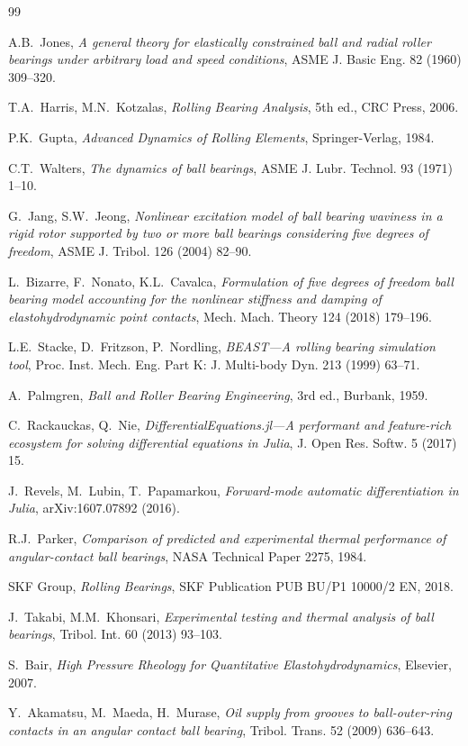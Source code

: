 \documentclass[preprint,12pt]{elsarticle}
\begin{document}
\begin{thebibliography}{99}

A.B.~Jones, \textit{A general theory for elastically constrained ball and radial roller bearings under arbitrary load and speed conditions}, ASME J. Basic Eng. 82 (1960) 309--320.

T.A.~Harris, M.N.~Kotzalas, \textit{Rolling Bearing Analysis}, 5th ed., CRC Press, 2006.

P.K.~Gupta, \textit{Advanced Dynamics of Rolling Elements}, Springer-Verlag, 1984.

C.T.~Walters, \textit{The dynamics of ball bearings}, ASME J. Lubr. Technol. 93 (1971) 1--10.

G.~Jang, S.W.~Jeong, \textit{Nonlinear excitation model of ball bearing waviness in a rigid rotor supported by two or more ball bearings considering five degrees of freedom}, ASME J. Tribol. 126 (2004) 82--90.

L.~Bizarre, F.~Nonato, K.L.~Cavalca, \textit{Formulation of five degrees of freedom ball bearing model accounting for the nonlinear stiffness and damping of elastohydrodynamic point contacts}, Mech. Mach. Theory 124 (2018) 179--196.

L.E.~Stacke, D.~Fritzson, P.~Nordling, \textit{BEAST---A rolling bearing simulation tool}, Proc. Inst. Mech. Eng. Part K: J. Multi-body Dyn. 213 (1999) 63--71.

A.~Palmgren, \textit{Ball and Roller Bearing Engineering}, 3rd ed., Burbank, 1959.

C.~Rackauckas, Q.~Nie, \textit{DifferentialEquations.jl---A performant and feature-rich ecosystem for solving differential equations in Julia}, J. Open Res. Softw. 5 (2017) 15.

J.~Revels, M.~Lubin, T.~Papamarkou, \textit{Forward-mode automatic differentiation in Julia}, arXiv:1607.07892 (2016).

R.J.~Parker, \textit{Comparison of predicted and experimental thermal performance of angular-contact ball bearings}, NASA Technical Paper 2275, 1984.

SKF Group, \textit{Rolling Bearings}, SKF Publication PUB BU/P1 10000/2 EN, 2018.

J.~Takabi, M.M.~Khonsari, \textit{Experimental testing and thermal analysis of ball bearings}, Tribol. Int. 60 (2013) 93--103.

S.~Bair, \textit{High Pressure Rheology for Quantitative Elastohydrodynamics}, Elsevier, 2007.

Y.~Akamatsu, M.~Maeda, H.~Murase, \textit{Oil supply from grooves to ball-outer-ring contacts in an angular contact ball bearing}, Tribol. Trans. 52 (2009) 636--643.

\end{thebibliography}
\end{document}
